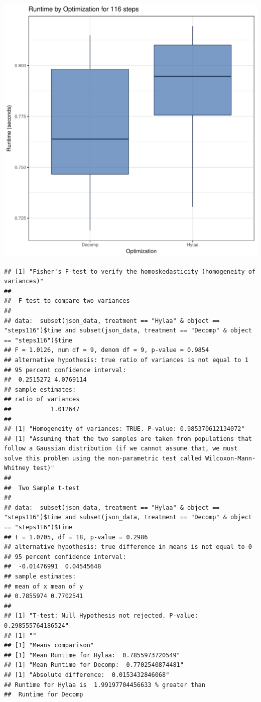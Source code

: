 \documentclass{article}\usepackage[]{graphicx}\usepackage[]{color}
\makeatletter
\def\maxwidth{ %
  \ifdim\Gin@nat@width>\linewidth
    \linewidth
  \else
    \Gin@nat@width
  \fi
}
\newenvironment{kframe}{%
 \def\at@end@of@kframe{}%
 \ifinner\ifhmode%
  \def\at@end@of@kframe{\end{minipage}}%
  \begin{minipage}{\columnwidth}%
 \fi\fi%
 \def\FrameCommand##1{\hskip\@totalleftmargin \hskip-\fboxsep
 \colorbox{shadecolor}{##1}\hskip-\fboxsep
     \hskip-\linewidth \hskip-\@totalleftmargin \hskip\columnwidth}%
 \MakeFramed {\advance\hsize-\width
   \@totalleftmargin\z@ \linewidth\hsize
   \@setminipage}}%
 {\par\unskip\endMakeFramed%
 \at@end@of@kframe}
\newenvironment{knitrout}{}{} %
\makeatother
\begin{document}
\begin{knitrout}
\color{fgcolor}
\includegraphics[width=\maxwidth]{figure/RH2_steps116-1} 
\begin{kframe}\begin{verbatim}
## [1] "Fisher's F-test to verify the homoskedasticity (homogeneity of variances)"
## 
## 	F test to compare two variances
## 
## data:  subset(json_data, treatment == "Hylaa" & object == "steps116")$time and subset(json_data, treatment == "Decomp" & object == "steps116")$time
## F = 1.0126, num df = 9, denom df = 9, p-value = 0.9854
## alternative hypothesis: true ratio of variances is not equal to 1
## 95 percent confidence interval:
##  0.2515272 4.0769114
## sample estimates:
## ratio of variances 
##           1.012647 
## 
## [1] "Homogeneity of variances: TRUE. P-value: 0.985370612134072"
## [1] "Assuming that the two samples are taken from populations that follow a Gaussian distribution (if we cannot assume that, we must solve this problem using the non-parametric test called Wilcoxon-Mann-Whitney test)"
## 
## 	Two Sample t-test
## 
## data:  subset(json_data, treatment == "Hylaa" & object == "steps116")$time and subset(json_data, treatment == "Decomp" & object == "steps116")$time
## t = 1.0705, df = 18, p-value = 0.2986
## alternative hypothesis: true difference in means is not equal to 0
## 95 percent confidence interval:
##  -0.01476991  0.04545648
## sample estimates:
## mean of x mean of y 
## 0.7855974 0.7702541 
## 
## [1] "T-test: Null Hypothesis not rejected. P-value: 0.298555764186524"
## [1] ""
## [1] "Means comparison"
## [1] "Mean Runtime for Hylaa:  0.7855973720549"
## [1] "Mean Runtime for Decomp:  0.7702540874481"
## [1] "Absolute difference:  0.0153432846068"
## Runtime for Hylaa is  1.99197704456633 % greater than 
##  Runtime for Decomp
\end{verbatim}
\end{kframe}
\end{knitrout}
\end{document}
